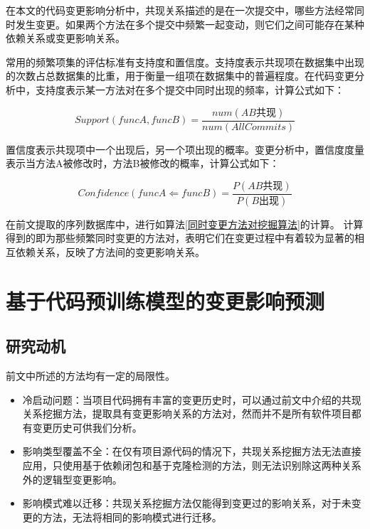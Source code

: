 在本文的代码变更影响分析中，共现关系描述的是在一次提交中，哪些方法经常同时发生变更。如果两个方法在多个提交中频繁一起变动，则它们之间可能存在某种依赖关系或变更影响关系。

常用的频繁项集的评估标准有支持度和置信度。支持度表示共现项在数据集中出现的次数占总数据集的比重，用于衡量一组项在数据集中的普遍程度。在代码变更分析中，支持度表示某一方法对在多个提交中同时出现的频率，计算公式如下：

\begin{equation}
\label{1_Support}
Support(funcA,funcB)=\frac{num(AB\text{共现})}{num(AllCommits)}
\end{equation}

置信度表示共现项中一个出现后，另一个项出现的概率。变更分析中，置信度度量表示当方法A被修改时，方法B被修改的概率，计算公式如下：

\begin{equation}
\label{1_Confidence}
Confidence(funcA\Leftarrow funcB)=\frac{P(AB\text{共现})}{P(B\text{出现})}
\end{equation}

在前文提取的序列数据库中，进行如算法\ref{同时变更方法对挖掘算法}的计算。
计算得到的即为那些频繁同时变更的方法对，表明它们在变更过程中有着较为显著的相互依赖关系，反映了方法间的变更影响关系。







\section{基于代码预训练模型的变更影响预测}
\subsection{研究动机}

前文中所述的方法均有一定的局限性。

\begin{itemize}

    \item 冷启动问题：当项目代码拥有丰富的变更历史时，可以通过前文中介绍的共现关系挖掘方法，提取具有变更影响关系的方法对，然而并不是所有软件项目都有变更历史可供我们分析。

    \item 影响类型覆盖不全：在仅有项目源代码的情况下，共现关系挖掘方法无法直接应用，只使用基于依赖闭包和基于克隆检测的方法，则无法识别除这两种关系外的逻辑型变更影响。
    
    \item 影响模式难以迁移：共现关系挖掘方法仅能得到变更过的影响关系，对于未变更的方法，无法将相同的影响模式进行迁移。
    
\end{itemize}


